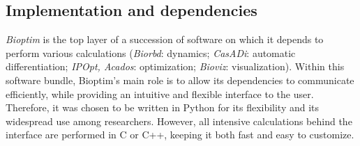\subsection{Implementation and dependencies}

\textit{Bioptim} is the top layer of a succession of software on which it depends to perform various calculations (\textit{Biorbd}: dynamics; \textit{CasADi}: automatic differentiation; \textit{IPOpt, Acados}: optimization; \textit{Bioviz}: visualization).
Within this software bundle, Bioptim's main role is to allow its dependencies to communicate efficiently, while providing an intuitive and flexible interface to the user.
Therefore, it was chosen to be written in Python for its flexibility and its widespread use among researchers.
However, all intensive calculations behind the interface are performed in C or C++, keeping it both fast and easy to customize.
